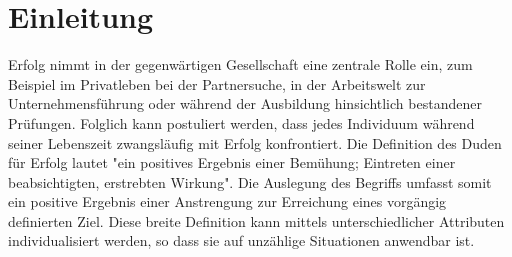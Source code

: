\section{Einleitung}
Erfolg nimmt in der gegenwärtigen Gesellschaft eine zentrale Rolle ein, zum Beispiel im Privatleben bei der Partnersuche, in der Arbeitswelt zur Unternehmensführung oder während der Ausbildung hinsichtlich bestandener Prüfungen. Folglich kann postuliert werden, dass jedes Individuum während seiner Lebenszeit zwangsläufig mit Erfolg konfrontiert. Die Definition des Duden für Erfolg lautet "ein positives Ergebnis einer Bemühung; Eintreten einer beabsichtigten, erstrebten Wirkung". Die Auslegung des Begriffs umfasst somit ein positive Ergebnis einer Anstrengung zur Erreichung eines vorgängig definierten Ziel. Diese breite Definition kann mittels unterschiedlicher Attributen individualisiert werden, so dass sie auf unzählige Situationen anwendbar ist.
\newline\newline
